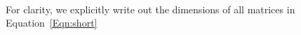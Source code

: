 \begin{equation}
\begin{array}{lll}
\
\end{array}
\end{equation}


For clarity, we explicitly write out the dimensions of all matrices in Equation~\ref{Eqn:short}


